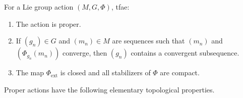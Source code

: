 \begin{cor}[{{\cite[Cor.~6.3.3]{RS1}}}]\label{cor 6.3.3 RS1}
    For a Lie group action $(M,G,\Phi)$, \gls{tfae}:
    \begin{enumerate}
        \item The action is proper.
        \item If $(g_n)\in G$ and $(m_n)\in M$ are sequences such that $(m_n)$ and $(\Phi_{g_n}(m_n))$ converge, then $(g_n)$ contains a convergent subsequence.
        \item The map $\Phi_{\mathrm{ext}}$ is closed and all stabilizers of $\Phi$ are compact.
    \end{enumerate}
\end{cor}

Proper actions have the following elementary topological properties.

